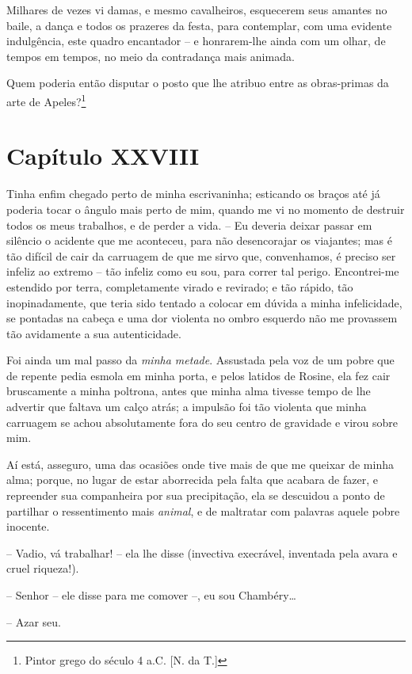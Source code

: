  Milhares de vezes vi damas, e mesmo cavalheiros, esquecerem seus
amantes no baile, a dança e todos os prazeres da festa, para
contemplar, com uma evidente indulgência, este quadro encantador -- e
honrarem-lhe ainda com um olhar, de tempos em tempos, no meio da
contradança mais animada.

 Quem poderia então disputar o posto que lhe atribuo entre as
obras-primas da arte de Apeles?\footnote{ Pintor grego do século 4 a.C. [N. da T.]} 

\section*{Capítulo XXVIII}

 Tinha enfim chegado perto de minha escrivaninha; esticando os braços
até já poderia tocar o ângulo mais perto de mim, quando me vi no
momento de destruir todos os meus trabalhos, e de perder a vida. -- Eu
deveria deixar passar em silêncio o acidente que me aconteceu, para não
desencorajar os viajantes; mas é tão difícil de cair da carruagem de
que me sirvo que, convenhamos, é preciso ser infeliz ao extremo --
tão infeliz como eu sou, para correr tal perigo. Encontrei-me estendido
por terra, completamente virado e revirado; e tão rápido, tão
inopinadamente, que teria sido tentado a colocar em dúvida a minha
infelicidade, se pontadas na cabeça e uma dor violenta no ombro
esquerdo não me provassem tão avidamente a sua autenticidade.

 Foi ainda um mal passo da \textit{minha metade}. Assustada pela voz de
um pobre que de repente pedia esmola em minha porta, e pelos latidos de
Rosine, ela fez cair bruscamente a minha poltrona, antes que minha alma
tivesse tempo de lhe advertir que faltava um calço atrás; a impulsão
foi tão violenta que minha carruagem se achou absolutamente fora do seu
centro de gravidade e virou sobre mim.

 Aí está, asseguro, uma das ocasiões onde tive mais de que me queixar de
minha alma; porque, no lugar de estar aborrecida pela falta que acabara
de fazer, e repreender sua companheira por sua precipitação, ela se
descuidou a ponto de partilhar o ressentimento mais \textit{animal}, e
de maltratar com palavras aquele pobre inocente.

 -- Vadio, vá trabalhar! -- ela lhe disse (invectiva execrável,
inventada pela avara e cruel riqueza!).

 -- Senhor -- ele disse para me comover --, eu sou Chambéry\ldots

 -- Azar seu.

